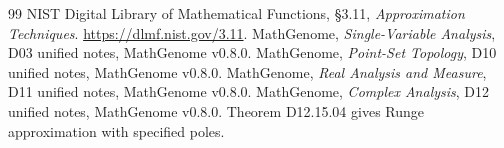 \documentclass[11pt,oneside,openany]{book}
\theoremstyle{definition}
\theoremstyle{remark}
\begin{document}
\begin{thebibliography}{99}
 NIST Digital Library of Mathematical Functions, \S 3.11, \emph{Approximation Techniques}. \url{https://dlmf.nist.gov/3.11}.
 MathGenome, \emph{Single-Variable Analysis}, D03 unified notes, MathGenome v0.8.0.
 MathGenome, \emph{Point-Set Topology}, D10 unified notes, MathGenome v0.8.0.
 MathGenome, \emph{Real Analysis and Measure}, D11 unified notes, MathGenome v0.8.0.
 MathGenome, \emph{Complex Analysis}, D12 unified notes, MathGenome v0.8.0. Theorem D12.15.04 gives Runge approximation with specified poles.
\end{thebibliography}
\end{document}
